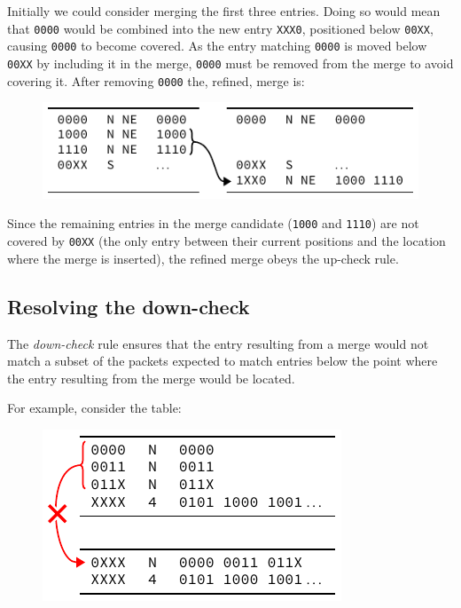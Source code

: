 \documentclass[conference]{IEEEtran}
\newcommand{\mytt}[1]{\texttt{\footnotesize#1}}
\begin{document}
  \noindent Initially we could consider merging the first three entries.
  Doing so would mean that \mytt{0000} would be combined into the new entry \mytt{XXX0}, positioned below \mytt{00XX}, causing \mytt{0000} to become covered.
  As the entry matching \mytt{0000} is moved below \mytt{00XX} by including it in the merge, \mytt{0000} must be removed from the merge to avoid covering it.
  After removing \mytt{0000} the, refined, merge is:\par\nopagebreak
  \begin{figure}[H]
    \centering
    \includegraphics{figures/upcheck_resolve_example_2}
  \end{figure}

  \noindent Since the remaining entries in the merge candidate (\mytt{1000} and \mytt{1110}) are not covered by \mytt{00XX} (the only entry between their current positions and the location where the merge is inserted), the refined merge obeys the up-check rule.

  \subsection{Resolving the down-check}

  The \textit{down-check} rule ensures that the entry resulting from a merge would not match a subset of the packets expected to match entries below the point where the entry resulting from the merge would be located.
  
  For example, consider the table:\par\nopagebreak
  \begin{figure}[H]
    \centering
    \includegraphics{figures/downcheck_resolve_example_1}
  \end{figure}
\end{document}
